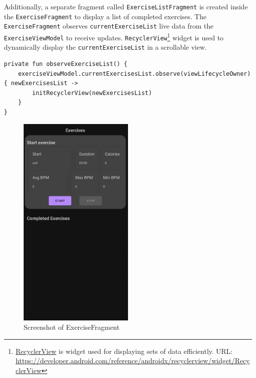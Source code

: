 Additionally, a separate fragment called \texttt{ExerciseListFragment} is created inside the \texttt{ExerciseFragment} to display a list of completed exercises. The \texttt{ExerciseFragment} observes \texttt{currentExerciseList} live data from the \texttt{ExerciseViewModel} to receive updates. 
\texttt{RecyclerView}\footnote{\url{RecyclerView} is widget used for displaying sets of data efficiently. URL: \url{https://developer.android.com/reference/androidx/recyclerview/widget/RecyclerView}} widget is used to dynamically display the \texttt{currentExerciseList} in a scrollable view. 
\begin{lstlisting}[caption={Observer for currentExercise (Kotlin - HomeFragment)}]
private fun observeExerciseList() {
    exerciseViewModel.currentExercisesList.observe(viewLifecycleOwner) { newExercisesList ->
        initRecyclerView(newExercisesList)
    }
}
\end{lstlisting}
\begin{figure}[H]
    \centering
    \includegraphics[width=0.5\textwidth]{images/exercisefragment-screenshot.png}
    \caption{Screenshot of ExerciseFragment}
    \label{fig:userfragment_screenshot}
\end{figure}

